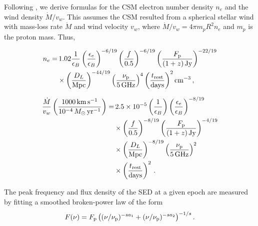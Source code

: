 \documentclass[twocolumn,twocolappendix, linenumbers, trackchanges]{aastex7}
\begin{document}
Following \citet{chrimesfhn}, we derive formulas for the CSM electron number density $n_e$ and the wind density $\dot M/v_w$.  This assumes the CSM resulted from a spherical stellar wind with mass-loss rate $\dot M$ and wind velocity $v_w$, where $\dot M/v_w=4 \pi m_p R^2 n_e$ and $m_p$ is the proton mass. Thus,

\begin{equation}
\begin{split}
    n_e =& \,1.02%
    \frac{1}{\epsilon_B}
    \left( \frac{\epsilon_e}{\epsilon_B}\right)^{-6/19}
    \left( \frac{f}{0.5}\right)^{-6/19}
    \left( \frac{F_{\rm p}}{(1+z)\,\text{Jy}}\right)^{-22/19} \\
    &\times
    \left( \frac{D_L}{\text{Mpc}}\right)^{-44/19}
    \left( \frac{\nu_{\rm p}}{5 \,\rm GHz}\right)^{4} 
    \left( \frac{t_{\text{rest}}}{\text{days}}\right)^{2} \mathrm{cm}^{-3}\, ,
\end{split}
\end{equation}

\begin{equation}
\begin{split}
    \frac{\dot M}{v_w}\left( \frac{1000\,\mathrm{km}\,\mathrm{s}^{-1}}{10^{-4}\,M_{\odot}\,\mathrm{yr}^{-1}}\right) =& \,2.5\times10^{-5} \left(\frac{1}{\epsilon_B}\right)
    \left( \frac{\epsilon_e}{\epsilon_B}\right)^{-8/19} \\
    &\times \left( \frac{f}{0.5}\right)^{-8/19}
    \left( \frac{F_{\rm p}}{(1+z)\,\text{Jy}}\right)^{-4/19} \\
    &\times
    \left( \frac{D_L}{\text{Mpc}}\right)^{-8/19}
    \left( \frac{\nu_{\rm p}}{5 \,\text{GHz}}\right)^{2} \\
    &\times \left( \frac{t_{\text{rest}}}{\text{days}}\right)^{2}\, .
\end{split}
\end{equation}

The peak frequency and flux density of the SED at a given epoch are measured by fitting a smoothed broken-power law of the form
\begin{equation}
F(\nu)=F_{\rm p}\left((\nu/\nu_{\rm p})^{-sa_1}+(\nu/\nu_{\rm p})^{-sa_2}\right)^{-1/s}.
\label{eq:broken}
\end{equation}
\end{document}
